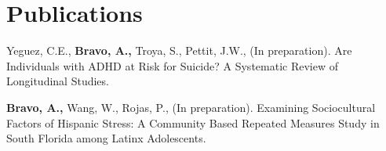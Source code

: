\documentclass[11pt,a4paper,]{awesome-cv}
\begin{document}
\begin{cventries}
    \vspace{-4.0mm}
    \vspace{-4.0mm}
\end{cventries}

\hypertarget{publications}{%
\section{Publications}\label{publications}}

Yeguez, C.E., \textbf{Bravo, A.,} Troya, S., Pettit, J.W., (In
preparation). Are Individuals with ADHD at Risk for Suicide? A
Systematic Review of Longitudinal Studies.

\textbf{Bravo, A.,} Wang, W., Rojas, P., (In preparation). Examining
Sociocultural Factors of Hispanic Stress: A Community Based Repeated
Measures Study in South Florida among Latinx Adolescents.


\label{LastPage}~
\end{document}
